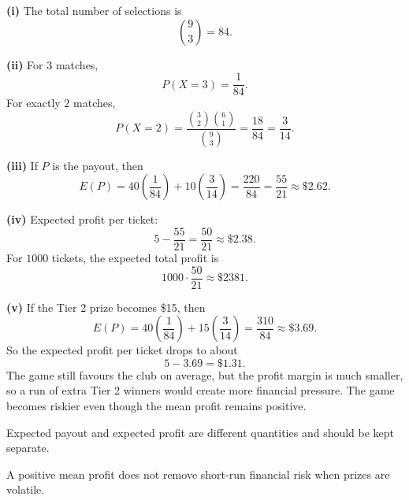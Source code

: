 \begin{solution}
\textbf{(i)} The total number of selections is
\[
\binom93=84.
\]

\textbf{(ii)} For $3$ matches,
\[
P(X=3)=\frac1{84}.
\]
For exactly $2$ matches,
\[
P(X=2)=\frac{\binom32\binom61}{\binom93}
=\frac{18}{84}
=\frac{3}{14}.
\]

\textbf{(iii)} If $P$ is the payout, then
\[
E(P)=40\left(\frac1{84}\right)+10\left(\frac3{14}\right)
=\frac{220}{84}
=\frac{55}{21}
\approx \$2.62.
\]

\textbf{(iv)} Expected profit per ticket:
\[
5-\frac{55}{21}=\frac{50}{21}\approx \$2.38.
\]
For $1000$ tickets, the expected total profit is
\[
1000\cdot \frac{50}{21}\approx \$2381.
\]

\textbf{(v)} If the Tier 2 prize becomes \$15, then
\[
E(P)=40\left(\frac1{84}\right)+15\left(\frac3{14}\right)
=\frac{310}{84}
\approx \$3.69.
\]
So the expected profit per ticket drops to about
\[
5-3.69=\$1.31.
\]
The game still favours the club on average, but the profit margin is much smaller, so a run of extra Tier 2 winners would create more financial pressure. The game becomes riskier even though the mean profit remains positive.
\end{solution}

\begin{takeaways}
\item Expected payout and expected profit are different quantities and should be kept separate.
\item A positive mean profit does not remove short-run financial risk when prizes are volatile.
\end{takeaways}

